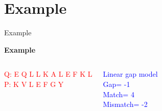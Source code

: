 \documentclass{bredelebeamer}
\begin{document}
 \section{Example}
 \begin{frame}{Example}
  \centering
  \begin{Large}
   \textbf{Example} \linebreak
  \end{Large}
\begin{columns}
\textcolor{red}{Q:  E Q L L K A L E F K L \\
P:  K V L E F G Y}

\textcolor{blue}{Linear gap model \\
Gap= -1 \\
Match= 4 \\
Mismatch= -2}


\end{columns}
\end{frame}
\end{document}
